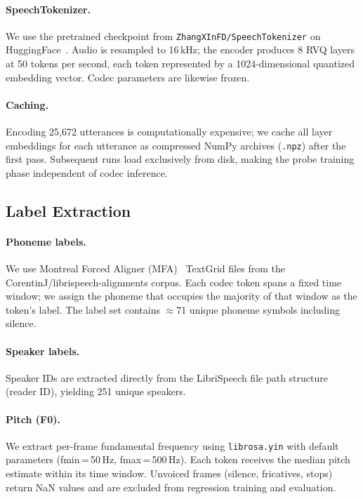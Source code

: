 \documentclass[10pt,twocolumn]{article}
\begin{document}
\paragraph{SpeechTokenizer.}
We use the pretrained checkpoint from \texttt{ZhangXInFD/SpeechTokenizer}
on HuggingFace~\cite{zhang2024}. Audio is resampled to 16\,kHz; the
encoder produces 8 RVQ layers at 50 tokens per second, each token
represented by a 1024-dimensional quantized embedding vector. Codec
parameters are likewise frozen.

\paragraph{Caching.}
Encoding 25,672 utterances is computationally expensive; we cache all
layer embeddings for each utterance as compressed NumPy archives
(\texttt{.npz}) after the first pass. Subsequent runs load exclusively
from disk, making the probe training phase independent of codec
inference.

\subsection{Label Extraction}

\paragraph{Phoneme labels.}
We use Montreal Forced Aligner (MFA)~\cite{mcauliffe2017} TextGrid
files from the CorentinJ/librispeech-alignments corpus. Each codec
token spans a fixed time window; we assign the phoneme that occupies
the majority of that window as the token's label. The label set
contains $\approx$71 unique phoneme symbols including silence.

\paragraph{Speaker labels.}
Speaker IDs are extracted directly from the LibriSpeech file path
structure (reader ID), yielding 251 unique speakers.

\paragraph{Pitch (F0).}
We extract per-frame fundamental frequency using \texttt{librosa.yin}
with default parameters (fmin\,=\,50\,Hz, fmax\,=\,500\,Hz). Each token
receives the median pitch estimate within its time window. Unvoiced
frames (silence, fricatives, stops) return NaN values and are excluded
from regression training and evaluation.
\end{document}
